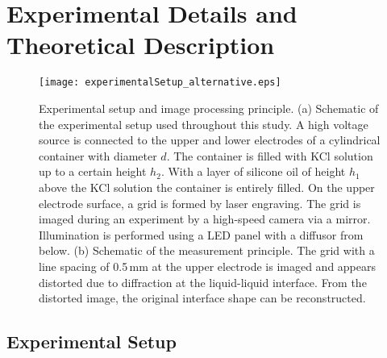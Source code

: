 \documentclass{jfm_arxiv}
\begin{document}
\section{Experimental Details and Theoretical Description}
\label{sec:experimentalDetails}

\begin{figure}
  \centerline{\texttt{[image: experimentalSetup\_alternative.eps]}}%
  \caption{Experimental setup and image processing principle. (a) Schematic of the experimental setup used throughout this study. A high voltage source is connected to the upper and lower electrodes of a cylindrical container with diameter $d$. The container is filled with KCl solution up to a certain height $h_2$. With a layer of silicone oil of height $h_1$ above the KCl solution the container is entirely filled. On the upper electrode surface, a grid is formed by laser engraving. The grid is imaged during an experiment by a high-speed camera via a mirror. Illumination is performed using a LED panel with a diffusor from below. 
  (b) Schematic of the measurement principle. The grid with a line spacing of 0.5\,mm at the upper electrode is imaged and appears distorted due to diffraction at the liquid-liquid interface. From the distorted image, the original interface shape can be reconstructed. 
}
\label{fig:experimentalSetup}
\end{figure}



\subsection{Experimental Setup}
\end{document}
